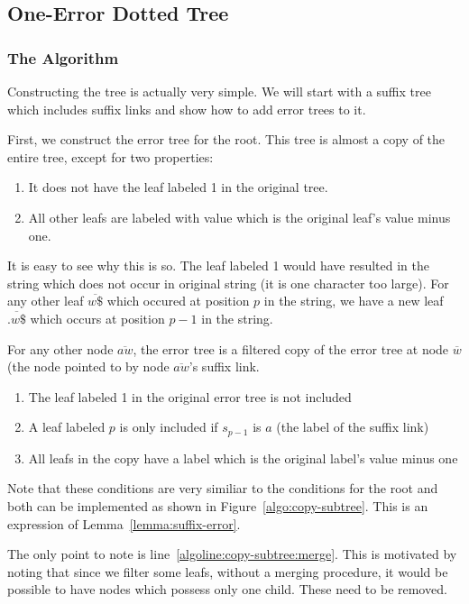 \subsection{One-Error Dotted Tree}
\subsubsection{The Algorithm}

Constructing the tree is actually very simple. We will start with a suffix tree which includes suffix links and show how to add error trees to it.

First, we construct the error tree for the root. This tree is almost a copy of the entire tree, except for two properties:

\begin{enumerate}
\item It does not have the leaf labeled 1 in the original tree.
\item All other leafs are labeled with value which is the original leaf's value minus one.
\end{enumerate}

It is easy to see why this is so. The leaf labeled 1 would have resulted in the string  which does not occur in original string (it is one character too large). For any other leaf $\overline{w\$}$ which occured at position $p$ in the string, we have a new leaf $\overline{.w\$}$ which occurs at position $p-1$ in the string.

For any other node $\overline{aw}$, the error tree is a filtered copy of the error tree at node $\overline{w}$ (the node pointed to by node $\overline{aw}$'s suffix link.

\begin{enumerate}
\item The leaf labeled 1 in the original error tree is not included
\item A leaf labeled $p$ is only included if $s_{p-1}$ is $a$ (the label of the suffix link)
\item All leafs in the copy have a label which is the original label's value minus one
\end{enumerate}

Note that these conditions are very similiar to the conditions for the root and both can be implemented as shown in Figure~\ref{algo:copy-subtree}. This is an expression of Lemma~\ref{lemma:suffix-error}.



The only point to note is line~\ref{algoline:copy-subtree:merge}. This is motivated by noting that since we filter some leafs, without a merging procedure, it would be possible to have nodes which possess only one child. These need to be removed.

